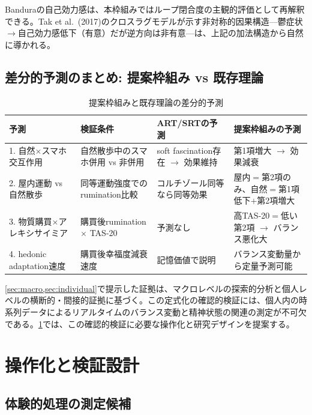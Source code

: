 \documentclass[a4paper,11pt,titlepage]{article}
\begin{document}
Banduraの自己効力感は、本枠組みではループ閉合度の主観的評価として再解釈できる。Tak et al.~(2017)のクロスラグモデルが示す非対称的因果構造---鬱症状$\to$自己効力感低下（有意）だが逆方向は非有意---は、上記の加法構造から自然に導かれる。


\subsection{差分的予測のまとめ: 提案枠組み vs 既存理論}\label{sec:differential}

\begin{table}[htbp]
\centering
\caption{提案枠組みと既存理論の差分的予測}
\label{tab:differential}
\small
\begin{tabular}{p{3.5cm}p{3.5cm}p{3.5cm}p{3cm}}
\toprule
予測 & 検証条件 & ART/SRTの予測 & 提案枠組みの予測 \\
\midrule
1. 自然$\times$スマホ交互作用 & 自然散歩中のスマホ併用 vs 非併用 & soft fascination存在 $\to$ 効果維持 & 第1項増大 $\to$ 効果減衰 \\
2. 屋内運動 vs 自然散歩 & 同等運動強度でのrumination比較 & コルチゾール同等なら同等効果 & 屋内$=$第2項のみ、自然$=$第1項低下$+$第2項増大 \\
3. 物質購買$\times$アレキシサイミア & 購買後rumination $\times$ TAS-20 & 予測なし & 高TAS-20$=$低い第2項 $\to$ バランス悪化大 \\
4. hedonic adaptation速度 & 購買後幸福度減衰速度 & 記憶価値で説明 & バランス変動量から定量予測可能 \\
\bottomrule
\end{tabular}
\end{table}

\cref{sec:macro,sec:individual}で提示した証拠は、マクロレベルの探索的分析と個人レベルの横断的・間接的証拠に基づく。この定式化の確認的検証には、個人内の時系列データによるリアルタイムのバランス変動と精神状態の関連の測定が不可欠である。\cref{sec:operationalization}では、この確認的検証に必要な操作化と研究デザインを提案する。


\section{操作化と検証設計}\label{sec:operationalization}

\subsection{体験的処理の測定候補}
\end{document}
